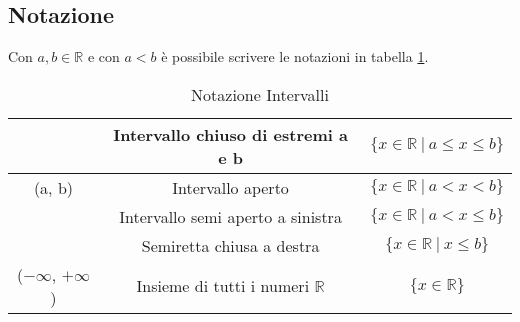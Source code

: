 \subsection{Notazione}
Con $a, b \in \mathbb{R}$ e con $a < b$ è possibile scrivere le notazioni in tabella \ref{tab:notazione-intervalli}.
\begin{table}[h!]
    \centering
    \setlength{\tabcolsep}{7pt}
    \renewcommand{\arraystretch}{2}
    \begin{tabular}{|c|c|c|} \hline
        [a, b] & Intervallo chiuso di estremi a e b & $\{x \in \mathbb{R} \: | \: a \leq x \leq b\}$ \\ \hline
        (a, b) & Intervallo aperto & $\{x \in \mathbb{R} \: | \: a < x < b\}$ \\ \hline
        [a, b) & Intervallo semi aperto a destra & $\{x \in \mathbb{R} \: | \: a \leq x < b\}$ \\ \hline
        (a, b] & Intervallo semi aperto a sinistra & $\{x \in \mathbb{R} \: | \: a < x \leq b\}$ \\ \hline
        [a, $+\infty$) & Semiretta chiusa a sinistra & $\{x \in \mathbb{R} \: | \: a \leq x\}$ \\ \hline
        ($-\infty$, b] & Semiretta chiusa a destra & $\{x \in \mathbb{R} \: | \: x \leq b\}$ \\ \hline
        ($-\infty$, $+\infty$) & Insieme di tutti i numeri $\mathbb{R}$ & $\{x \in \mathbb{R}\}$ \\ \hline
    \end{tabular}
    \caption{Notazione Intervalli}
    \label{tab:notazione-intervalli}
\end{table}